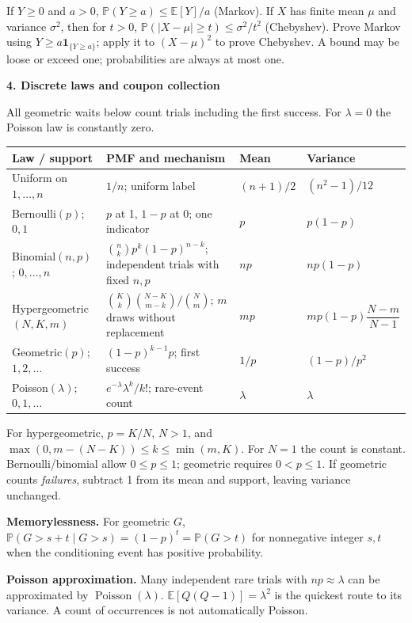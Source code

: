 \documentclass[11pt,letterpaper]{article}
\renewcommand{\P}{\mathbb P}
\newcommand{\E}{\mathbb E}
\newcommand{\ind}{\mathbf1}
\newcommand{\topic}[1]{{\Large\bfseries\color{indigo}#1}\par\medskip}
\newcommand{\subtopic}[1]{\par\addvspace{7pt}{\bfseries\color{mint}#1}\par\nobreak}
\begin{document}
\subtopic{Bounds with hypotheses}
If $Y\ge0$ and $a>0$, $\P(Y\ge a)\le\E[Y]/a$ (Markov).
If $X$ has finite mean $\mu$ and variance $\sigma^2$, then for $t>0$,
$\P(|X-\mu|\ge t)\le\sigma^2/t^2$ (Chebyshev).
Prove Markov using $Y\ge a\ind_{\{Y\ge a\}}$; apply it to
$(X-\mu)^2$ to prove Chebyshev. A bound may be loose or exceed one;
probabilities are always at most one.

\newpage
\topic{4. Discrete laws and coupon collection}
{\small All geometric waits below count trials including the first success.
For $\lambda=0$ the Poisson law is constantly zero.}\par
\begin{center}\footnotesize
\renewcommand{\arraystretch}{1.6}
\begin{tabular}{@{}>{\raggedright\arraybackslash}p{1.18in}p{2.32in}p{.61in}p{1.23in}@{}}
\toprule
Law / support & PMF and mechanism & Mean & Variance\\
\midrule
Uniform on $1,\ldots,n$ & $1/n$; uniform label & $(n+1)/2$ & $(n^2-1)/12$\\
Bernoulli$(p)$; $0,1$ & $p$ at 1, $1-p$ at 0; one indicator & $p$ & $p(1-p)$\\
Binomial$(n,p)$; $0,\ldots,n$ & $\binom nkp^k(1-p)^{n-k}$; independent trials with fixed $n,p$ & $np$ & $np(1-p)$\\
Hypergeometric\newline $(N,K,m)$ & $\binom Kk\binom{N-K}{m-k}/\binom Nm$; $m$ draws without replacement & $mp$ & $mp(1-p)\dfrac{N-m}{N-1}$\\
Geometric$(p)$; $1,2,\ldots$ & $(1-p)^{k-1}p$; first success & $1/p$ & $(1-p)/p^2$\\
Poisson$(\lambda)$; $0,1,\ldots$ & $e^{-\lambda}\lambda^k/k!$; rare-event count & $\lambda$ & $\lambda$\\
\bottomrule
\end{tabular}
\end{center}
For hypergeometric, $p=K/N$, $N>1$, and
$\max(0,m-(N-K))\le k\le\min(m,K)$.
For $N=1$ the count is constant. Bernoulli/binomial allow $0\le p\le1$;
geometric requires $0<p\le1$. If geometric counts \emph{failures}, subtract 1
from its mean and support, leaving variance unchanged.

\textbf{Memorylessness.} For geometric $G$,
$\P(G>s+t\mid G>s)=(1-p)^t=\P(G>t)$ for nonnegative integer $s,t$
when the conditioning event has positive probability.

\textbf{Poisson approximation.} Many independent rare trials with $np\approx\lambda$
can be approximated by $\operatorname{Poisson}(\lambda)$.
$\E[Q(Q-1)]=\lambda^2$ is the quickest route to its variance.
A count of occurrences is not automatically Poisson.
\end{document}
